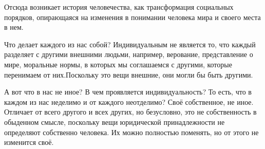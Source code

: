 Отсюда возникает история человечества, как трансформация социальных порядков,
опирающаяся на изменения в понимании человека мира и своего места в нем. 



Что делает
каждого из нас собой? Индивидуальным не является то, что каждый разделяет с другими
внешними людьми, например, верование, представление о мире, моральные нормы, в
которых мы соглашаемся с другими, которые перенимаем от них.Поскольку это вещи
внешние, они могли бы быть другими. 

А вот что в нас не иное? В чем проявляется
индивидуальность? То есть, что в каждом из нас неделимо и от каждого неотделимо?
Своё собственное, не иное. Отличает от всего другого и всех других, но
безусловно, это не собственность в обыденном смысле, поскольку вещи юридической
принадлежности не определяют собственно человека. Их можно полностью поменять,
но от этого не изменится своё. 

